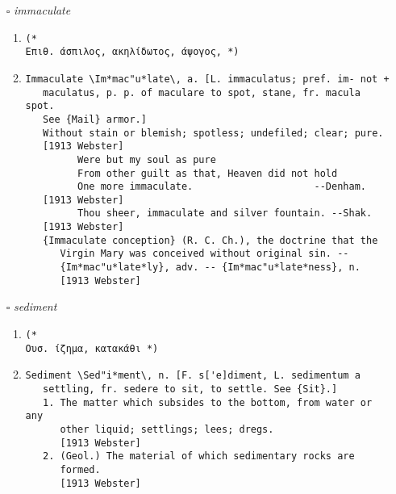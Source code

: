 \documentclass{article}
\begin{document}
\begin{itemize}
\begin{enumerate}
\item{
\begin{lstlisting}
Indomitable \In*dom"i*ta*ble\, a. [L. indomitabilis; pref. in-
   not + domitare, intens. fr. domare to tame. See {Tame}.]
   Not to be subdued; untamable; invincible; as, an indomitable
   will, courage, animal.
   [1913 Webster]
\end{lstlisting}}
\end{enumerate}
\item[$\square$] \emph{ immaculate }
\begin{enumerate}
\item{
\begin{lstlisting}
(* 
Επιθ. άσπιλος, ακηλίδωτος, άψογος, *)
\end{lstlisting}}
\item{
\begin{lstlisting}
Immaculate \Im*mac"u*late\, a. [L. immaculatus; pref. im- not +
   maculatus, p. p. of maculare to spot, stane, fr. macula spot.
   See {Mail} armor.]
   Without stain or blemish; spotless; undefiled; clear; pure.
   [1913 Webster]
         Were but my soul as pure
         From other guilt as that, Heaven did not hold
         One more immaculate.                     --Denham.
   [1913 Webster]
         Thou sheer, immaculate and silver fountain. --Shak.
   [1913 Webster]
   {Immaculate conception} (R. C. Ch.), the doctrine that the
      Virgin Mary was conceived without original sin. --
      {Im*mac"u*late*ly}, adv. -- {Im*mac"u*late*ness}, n.
      [1913 Webster]
\end{lstlisting}}
\end{enumerate}
\item[$\square$] \emph{ sediment }
\begin{enumerate}
\item{
\begin{lstlisting}
(* 
Ουσ. ίζημα, κατακάθι *)
\end{lstlisting}}
\item{
\begin{lstlisting}
Sediment \Sed"i*ment\, n. [F. s['e]diment, L. sedimentum a
   settling, fr. sedere to sit, to settle. See {Sit}.]
   1. The matter which subsides to the bottom, from water or any
      other liquid; settlings; lees; dregs.
      [1913 Webster]
   2. (Geol.) The material of which sedimentary rocks are
      formed.
      [1913 Webster]
\end{lstlisting}}
\end{enumerate}


\end{itemize}
\end{document}
